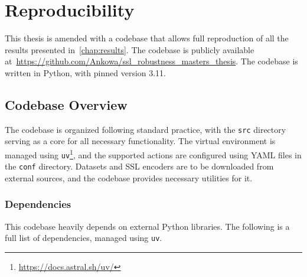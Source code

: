 \chapter{Reproducibility}
\label{chap:reproducibility}

This thesis is amended with a codebase that allows full reproduction of all the results presented in~\cref{chap:results}. The codebase is publicly available at~\url{https://github.com/Ankowa/ssl_robustness_masters_thesis}. The codebase is written in Python, with pinned version 3.11.

\section{Codebase Overview}

The codebase is organized following standard practice, with the \texttt{src} directory serving as a core for all necessary functionality. The virtual environment is managed using \texttt{uv}\footnote{\url{https://docs.astral.sh/uv/}}, and the supported actions are configured using YAML files in the \texttt{conf} directory. Datasets and SSL encoders are to be downloaded from external sources, and the codebase provides necessary utilities for it.

\subsection{Dependencies}

This codebase heavily depends on external Python libraries. The following is a full list of dependencies, managed using \texttt{uv}.

